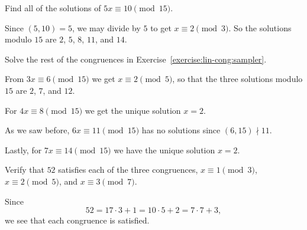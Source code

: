  Find all of the solutions of $5x\equiv10\pmod{15}$.
\begin{solution}
  Since $(5,10) = 5$, we may divide by $5$ to get $x\equiv2\pmod3$. So
  the solutions modulo $15$ are $2$, $5$, $8$, $11$, and $14$.
\end{solution}

 Solve the rest of the congruences in
Exercise~\ref{exercise:lin-cong:sampler}.
\begin{solution}
  From $3x\equiv6\pmod{15}$ we get $x\equiv2\pmod{5}$, so that the
  three solutions modulo $15$ are $2$, $7$, and $12$.

  For $4x\equiv8\pmod{15}$ we get the unique solution $x = 2$.

  As we saw before, $6x\equiv11\pmod{15}$ has no solutions since
  $(6,15)\nmid11$.

  Lastly, for $7x\equiv14\pmod{15}$ we have the unique solution
  $x = 2$.
\end{solution}

 Verify that $52$ satisfies each of the three congruences,
$x\equiv1\pmod3$, $x\equiv2\pmod5$, and $x\equiv3\pmod7$.
\begin{solution}
  Since
  \begin{equation*}
    52 = 17\cdot3 + 1 = 10\cdot5 + 2 = 7\cdot7 + 3,
  \end{equation*}
  we see that each congruence is satisfied.
\end{solution}
